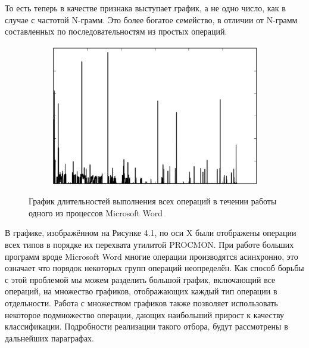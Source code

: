 То есть теперь в качестве признака выступает график, а не одно число, как в случае с частотой N-грамм. Это более богатое семейство, в отличии от N-грамм составленных по последовательностям из простых операций.

\begin{figure}[ht]
	\centering
    \begin{subfigure}[b]{1\textwidth}
    \centering
        \includegraphics[scale=0.5]{pasted-image-29.png}
    \end{subfigure}
 
    \caption{График длительностей выполнения всех операций в течении работы одного из процессов Microsoft Word}
    \label{fig_parsetree}
\end{figure}

В графике, изображённом на Рисунке 4.1, по оси X были отображены операции всех типов в порядке их перехвата утилитой PROCMON. При работе больших программ вроде Microsoft Word многие операции производятся асинхронно, это означает что порядок некоторых групп операций неопределён. Как способ борьбы с этой проблемой мы можем разделить большой график, включающий все операций, на множество графиков, отображающих каждый тип операции в отдельности. Работа с множеством графиков также позволяет использовать некоторое подмножество операции, дающих наибольший прирост к качеству классификации. Подробности реализации такого отбора, будут рассмотрены в дальнейших параграфах.

